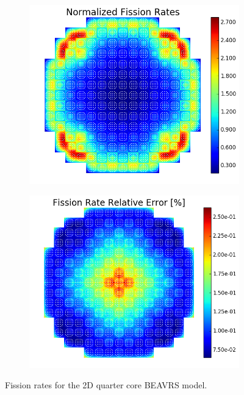 \begin{figure}[h!]
\centering
\begin{subfigure}{0.44\textwidth}
  \centering
  \includegraphics[width=\linewidth]{figures/benchmarks/fission-rates/fiss-mean-full-core}
  \caption{}
  \label{fig:chap7-fiss-rate-mean-full-core}
\end{subfigure}%
\begin{subfigure}{0.44\textwidth}
  \centering
  \includegraphics[width=\linewidth]{figures/benchmarks/fission-rates/fiss-rel-err-full-core}
  \caption{}
  \label{fig:chap7-fiss-rate-rel-err-full-core}
\end{subfigure}%
\caption[Fission rates for the full 2D BEAVRS core]{Fission rates for the 2D quarter core \ac{BEAVRS} model.}
\label{fig:chap7-fiss-rates-full-core}
\end{figure}

